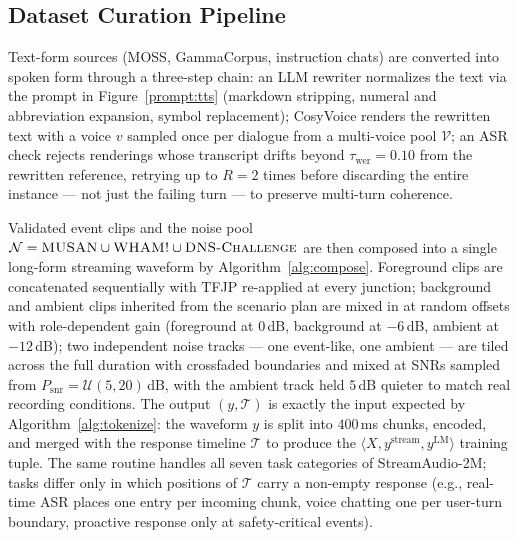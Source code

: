 \documentclass{article}
\begin{document}
\subsection{Dataset Curation Pipeline}
\label{appendix:curation}

Text-form sources (MOSS, GammaCorpus, instruction chats) are converted
into spoken form through a three-step chain: an LLM rewriter normalizes
the text via the prompt in Figure~\ref{prompt:tts} (markdown stripping,
numeral and abbreviation expansion, symbol replacement); CosyVoice
renders the rewritten text with a voice $v$ sampled once per dialogue
from a multi-voice pool $\mathcal{V}$; an ASR check rejects renderings
whose transcript drifts beyond
$\tau_{\text{wer}}=0.10$ from the rewritten reference, retrying up to
$R=2$ times before discarding the entire instance --- not just the
failing turn --- to preserve multi-turn coherence.

Validated event clips and the noise pool
$\mathcal{N}=\textsc{MUSAN}\cup\textsc{WHAM!}\cup\textsc{DNS\text{-}Challenge}$
are then composed into a single long-form streaming waveform by
Algorithm~\ref{alg:compose}. Foreground clips are concatenated
sequentially with TFJP re-applied at every junction; background and
ambient clips inherited from the scenario plan are mixed in at random
offsets with role-dependent gain (foreground at $0$\,dB, background at
$-6$\,dB, ambient at $-12$\,dB); two independent noise tracks --- one
event-like, one ambient --- are tiled across the full duration with
crossfaded boundaries and mixed at SNRs sampled from
$P_{\text{snr}}=\mathcal{U}(5, 20)$\,dB, with the ambient track held
$5$\,dB quieter to match real recording conditions. The output
$(y, \mathcal{T})$ is exactly the input expected by
Algorithm~\ref{alg:tokenize}: the waveform $y$ is split into $400$\,ms
chunks, encoded, and merged with the response timeline $\mathcal{T}$ to
produce the $\langle X, y^{\text{stream}}, y^{\text{LM}}\rangle$
training tuple. The same routine handles all seven task categories of
StreamAudio-2M; tasks differ only in which positions of $\mathcal{T}$
carry a non-empty response (e.g., real-time ASR places one entry per
incoming chunk, voice chatting one per user-turn boundary, proactive
response only at safety-critical events).
\end{document}
